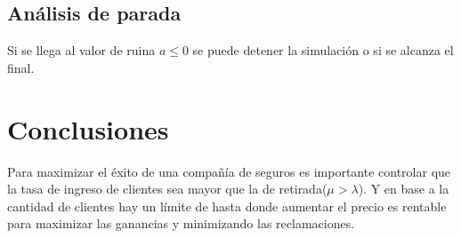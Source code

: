 \documentclass[12pt, a4paper]{article}
\begin{document}
\subsection*{Análisis de parada}
Si se llega al valor de ruina $a\leq0$ se puede detener la simulación o si se alcanza el final. 

\section{Conclusiones} 
Para maximizar el éxito de una compañía de seguros es importante controlar que la tasa de ingreso de clientes sea mayor que la de retirada($\mu > \lambda$). Y en base a la cantidad de clientes
hay un límite de hasta donde aumentar el precio es rentable para maximizar las ganancias y minimizando las reclamaciones. 
\end{document}
